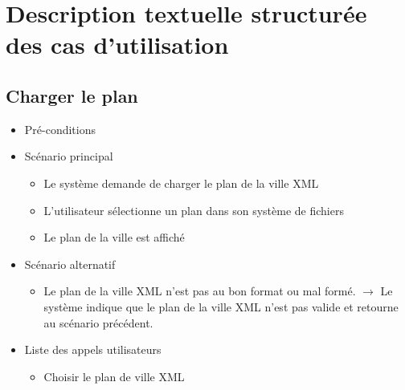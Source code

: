 \documentclass[10pt,a4paper]{book}
\begin{document}
\section{Description textuelle structurée des cas d'utilisation}
\subsection{Charger le plan}
\begin{itemize}
	\item{Pré-conditions}
	\item{Scénario principal}
	\begin{itemize}
		\item{Le système demande de charger le plan de la ville XML}
		\item{L’utilisateur sélectionne un plan dans son système de fichiers}
		\item{Le plan de la ville est affiché}
	\end{itemize}
	\item{Scénario alternatif}
	\begin{itemize}
		\item{Le plan de la ville XML n’est pas au bon format ou mal formé. $\rightarrow$ Le système indique que le plan de la ville XML n’est pas valide et retourne au scénario précédent.}
	\end{itemize}
	\item{Liste des appels utilisateurs}
	\begin{itemize}
		\item{Choisir le plan de ville XML}
	\end{itemize}
\end{itemize}
\end{document}
